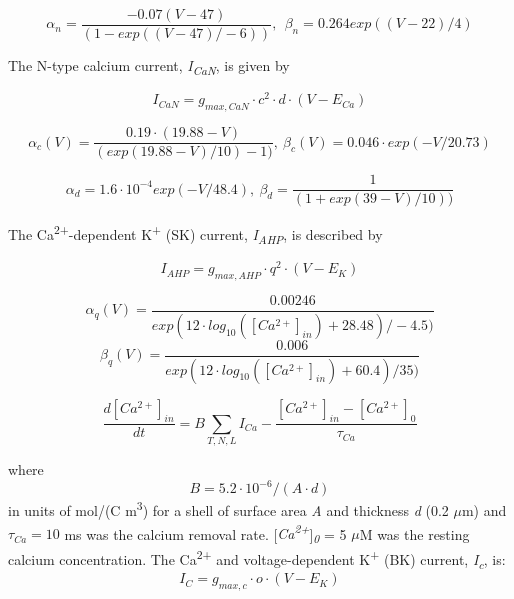 \documentclass[12pt]{article}
\begin{document}
\begin{equation}
\alpha_{n}=\frac{-0.07(V-47)}{(1-exp((V-47)/-6))}, \ \  \beta_{n}=0.264exp((V-22)/4)
\end{equation}

The N-type calcium current, \textit{I}\textit{\textsubscript{CaN}}, is given by

\begin{equation}
I_{CaN}=g_{max, CaN} \cdot c^2 \cdot d \cdot (V-E_{Ca})
\end{equation}

\begin{equation}
\alpha_c(V)=\frac{0.19\cdot(19.88-V)}{(exp(19.88-V)/10)-1)}, \  \beta_c(V)=0.046 \cdot exp(-V/20.73)
\end{equation}

\begin{equation}
\alpha_d=1.6\cdot10^{-4}exp(-V/48.4) , \  \beta_d=\frac 1{(1+exp(39-V)/10))}
\end{equation}

The Ca\textsuperscript{2+}-dependent K\textsuperscript{+} (SK) current, \textit{I\textsubscript{AHP}}, is described by

\begin{equation}
I_{AHP} = g_{max, AHP} \cdot q^2 \cdot (V-E_K)
\end{equation}

\begin{equation}
\alpha_q(V)=\frac{0.00246}{exp(12\cdot log_{10}([Ca^{2+}]_{in})+28.48)/-4.5)}
\end{equation} 
\begin{equation}
\beta_q(V)=\frac{0.006}{exp(12\cdot log_{10}([Ca^{2+}]_{in})+60.4)/35)}
\end{equation}

\begin{equation}
\label{eq:CaDynamics}
\frac{d[Ca^{2+}]_{in}}{dt}=B\sum_{T, N, L}
I_{Ca}-\frac{[Ca^{2+}]_{in}-[Ca^{2+}]_0}{\tau_{Ca}}
\end{equation}

where
\begin{equation}
B = 5.2\cdot 10^{-6}/(A \cdot d)
\end{equation}
in units of mol/(C m\textsuperscript{3}) for a shell of
surface area \textit{A} and thickness \textit{d} (0.2 $\mu $m) and  $\tau_{Ca}=10$ ms was the calcium removal rate. [\textit{Ca\textsuperscript{2+}}]\textit{\textsubscript{0}} = 5 $\mu$M was the resting calcium concentration. 
The Ca\textsuperscript{2+} and voltage-dependent K\textsuperscript{+} (BK) current, \textit{I\textsubscript{c}}, is:
\begin{equation}
I_C=g_{max, c} \cdot o \cdot (V-E_K)
\end{equation}
\end{document}
